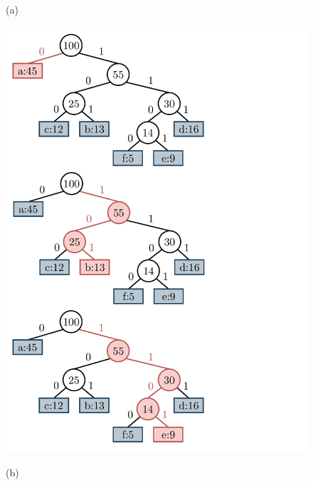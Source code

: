 \begin{figure}
\begin{minipage}{1\textwidth}
\begin{minipage}{0.45\textwidth}
    			(a)
    		\end{minipage}
    		\begin{minipage}{0.45\textwidth}
    			\centering
    			\includegraphics[scale=.45, clip, trim=10 290 200 280]{img/graphs-huffmanBack.pdf}

    			(b)
    		\end{minipage}  		
    	\end{minipage}
    	

\end{figure}
